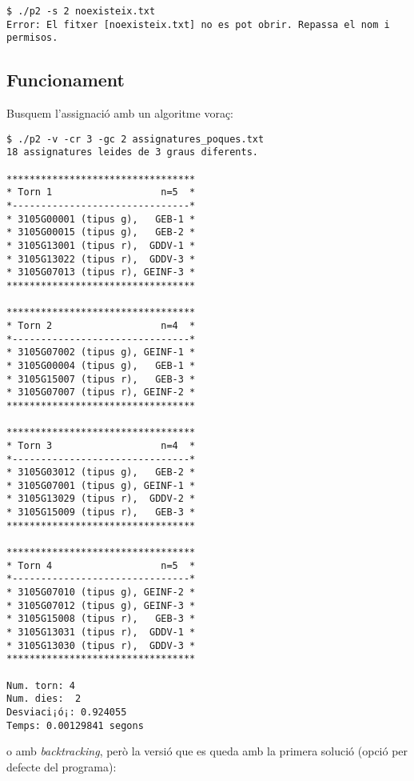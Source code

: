 \documentclass[10pt,a4paper]{../documents/class_material_assignatura_udg}
\begin{document}
\begin{lstlisting}[style=codibash]
$ ./p2 -s 2 noexisteix.txt
Error: El fitxer [noexisteix.txt] no es pot obrir. Repassa el nom i permisos.
\end{lstlisting}

\subsection{Funcionament}\label{sec:sortida}

Busquem l'assignació amb un algoritme voraç:
\begin{lstlisting}[style=codibash]
$ ./p2 -v -cr 3 -gc 2 assignatures_poques.txt
18 assignatures leides de 3 graus diferents.

*********************************
* Torn 1                   n=5  *
*-------------------------------*
* 3105G00001 (tipus g),   GEB-1 *
* 3105G00015 (tipus g),   GEB-2 *
* 3105G13001 (tipus r),  GDDV-1 *
* 3105G13022 (tipus r),  GDDV-3 *
* 3105G07013 (tipus r), GEINF-3 *
*********************************

*********************************
* Torn 2                   n=4  *
*-------------------------------*
* 3105G07002 (tipus g), GEINF-1 *
* 3105G00004 (tipus g),   GEB-1 *
* 3105G15007 (tipus r),   GEB-3 *
* 3105G07007 (tipus r), GEINF-2 *
*********************************

*********************************
* Torn 3                   n=4  *
*-------------------------------*
* 3105G03012 (tipus g),   GEB-2 *
* 3105G07001 (tipus g), GEINF-1 *
* 3105G13029 (tipus r),  GDDV-2 *
* 3105G15009 (tipus r),   GEB-3 *
*********************************

*********************************
* Torn 4                   n=5  *
*-------------------------------*
* 3105G07010 (tipus g), GEINF-2 *
* 3105G07012 (tipus g), GEINF-3 *
* 3105G15008 (tipus r),   GEB-3 *
* 3105G13031 (tipus r),  GDDV-1 *
* 3105G13030 (tipus r),  GDDV-3 *
*********************************

Num. torn: 4
Num. dies:  2
Desviaci¡ó¡: 0.924055
Temps: 0.00129841 segons
\end{lstlisting}
o amb \textit{backtracking}, però la versió que es queda amb la primera solució (opció per defecte del programa):
\end{document}
